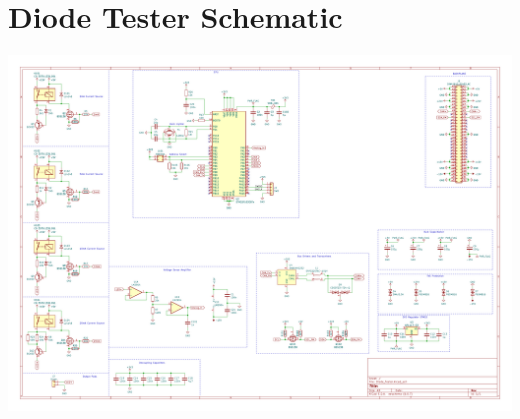 \documentclass[11pt, a4paper, listof=numbered, captions=tableheading, headinclude, table, xcdraw]{scrreprt}
\begin{document}
\chapter{Diode Tester Schematic}
\includegraphics[page=1,angle=90,width=\textwidth]{schematics/Diode_Tester.pdf}\newpage
\end{document}
